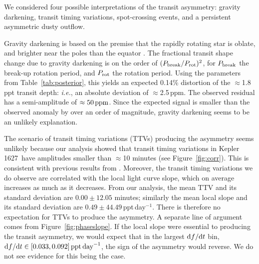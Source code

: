 \documentclass[12pt,modern,twocolumn,tighten]{aastex63}
\newcommand{\sn}{Kepler\,1627} %
\begin{document}
We considered four possible interpretations of the transit asymmetry:
gravity darkening, transit timing variations, spot-crossing events,
and a persistent asymmetric dusty outflow.  

Gravity darkening is based on the premise that the rapidly rotating
star is oblate, and brighter near the poles than the equator
\citep[{\it e.g.},][]{masuda_spin-orbit_2015}.  The fractional transit
shape change due to gravity darkening is on the order of $(P_{\rm
break}/P_{\rm rot})^2$, for $P_{\rm break}$ the break-up rotation
period, and $P_{\rm rot}$ the rotation period.  Using the parameters
from Table~\ref{tab:posterior}, this yields an expected 0.14\%
distortion of the $\approx$1.8\,ppt transit depth: {\it i.e.}, an
absolute deviation of $\approx$2.5\,ppm.  The observed residual has a
semi-amplitude of $\approx 50\,{\rm ppm}$.  Since the expected signal
is smaller than the observed anomaly by over an order of magnitude,
gravity darkening seems to be an unlikely explanation.

The scenario of transit timing variations (TTVs) producing the
asymmetry seems unlikely because our analysis showed that transit
timing variations in \sn\ have amplitudes smaller than $\approx$10
minutes (see Figure~\ref{fig:corr}).  This is consistent with
previous results from \citet{holczer_transit_2016}.  Moreover, the
transit timing variations we do observe are correlated with the local
light curve slope, which on average increases as much as it decreases.
From our analysis, the mean TTV and its standard deviation are
$0.00\pm12.05$ minutes; similarly the mean local slope and its
standard deviation are $0.49\pm44.49$\,ppt\,day$^{-1}$.  There is
therefore no expectation for TTVs to produce the asymmetry.  A
separate line of argument comes from Figure~\ref{fig:phaseslope}.  If
the local slope were essential to producing the transit asymmetry, we
would expect that in the largest ${\rm d}f/{\rm d}t$ bin, ${\rm
d}f/{\rm d}t\in[0.033,0.092]\,{\rm ppt\,day}^{-1}$, the sign of the
asymmetry would reverse.  We do not see evidence for this being the
case.
\end{document}
